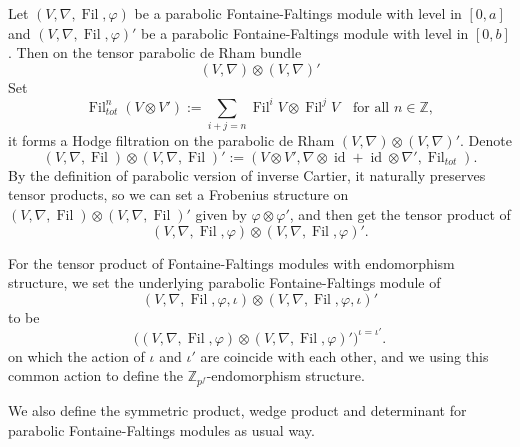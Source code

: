\documentclass[12pt,twoside]{book}
\theoremstyle{plain}
\theoremstyle{definition}
\theoremstyle{remark}
\newcommand{\bZ}{{\mathbb Z}}
\DeclareMathOperator\Fil{Fil}
\DeclareMathOperator\id{id}
\numberwithin{equation}{section}
\begin{document}
Let $(V,\nabla,\Fil,\varphi)$ be a parabolic Fontaine-Faltings module with level in $[0,a]$ and $(V,\nabla,\Fil,\varphi)'$ be a parabolic Fontaine-Faltings module with level in $[0,b]$. Then on the tensor parabolic de Rham bundle
\[(V,\nabla)\otimes (V,\nabla)'\]
Set
\[\Fil_{tot}^n(V\otimes V'):= \sum_{i+j=n}\Fil^iV\otimes \Fil^jV\quad \text{for all $n\in\bZ$},\]
it forms a Hodge filtration on the parabolic de Rham $(V,\nabla)\otimes (V,\nabla)'$. Denote
\[(V,\nabla,\Fil)\otimes (V,\nabla,\Fil)':=(V\otimes V',\nabla\otimes\id +\id\otimes\nabla',\Fil_{tot}).\]
By the definition of parabolic version of inverse Cartier, it naturally preserves tensor products, so we can set a Frobenius structure on $(V,\nabla,\Fil)\otimes (V,\nabla,\Fil)'$ given by $\varphi\otimes\varphi'$, and then get the tensor product of
\[(V,\nabla,\Fil,\varphi) \otimes (V,\nabla,\Fil,\varphi)'.\]

For the tensor product of Fontaine-Faltings modules with endomorphism structure, we set the underlying parabolic Fontaine-Faltings module of
\[(V,\nabla,\Fil,\varphi,\iota) \otimes (V,\nabla,\Fil,\varphi,\iota)'\]
to be
\[\Big((V,\nabla,\Fil,\varphi) \otimes (V,\nabla,\Fil,\varphi)'\Big)^{\iota=\iota'}.\]
on which the action of $\iota$ and $\iota'$ are coincide with each other, and we using this common action to define the $\bZ_{p^f}$-endomorphism structure.

We also define the symmetric product, wedge product and determinant for parabolic Fontaine-Faltings modules as usual way.
\end{document}
